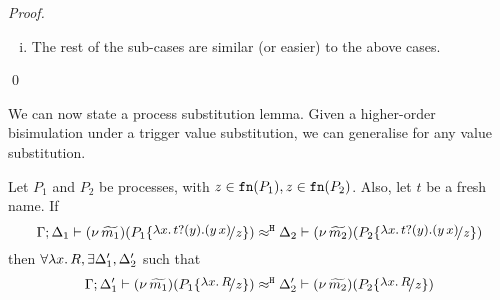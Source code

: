 \begin{proof}
\begin{enumerate}
\begin{enumerate}[i.]


					\item	The rest of the sub-cases are similar (or easier) to the above cases.

%					
				\end{enumerate}
	\end{enumerate}
	\qed
\end{proof}




We can now state a process substitution lemma.
Given a higher-order bisimulation under a trigger value
substitution, we can generalise for any value substitution.


\begin{lemma}
	\label{lem:process_subst}
	Let $P_1$ and $P_2$ be processes, with $z \in \mathtt{fn}(P_1), z \in \mathtt{fn}(P_2)$.
	Also, let $t$ be a fresh name.
	If
	\[
		\horel{\Gamma}{\Delta_1}{\newsp{\widetilde{m_1}}{P_1 \subst{\trvalx{t}}{z} }}
		{\hwb}
		{\Delta_2}{\newsp{\widetilde{m_2}}{P_2 \subst{\trvalx{t}}{z} }}
	\]
	then $\forall \lambda x.\,R, \exists \Delta_1', \Delta_2'$ such that
	\[
		\horel{\Gamma}{\Delta_1'}{\newsp{\widetilde{m_1}}{P_1 \subst{{\abs{x}{R}}}{z} }}
		{\hwb}
		{\Delta_2'}{\newsp{\widetilde{m_2}}{P_2 \subst{{\abs{x}{R}}}{z} }}
	\]
\end{lemma}


